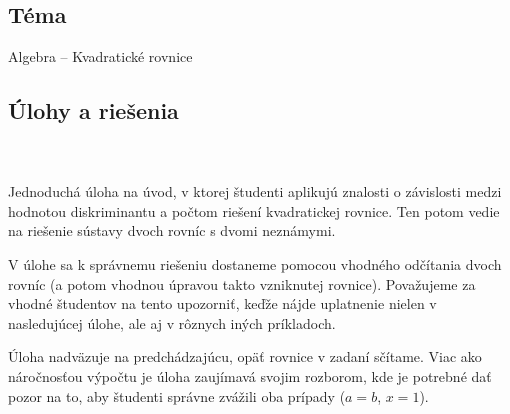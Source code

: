 
\subsection*{Téma}
Algebra -- Kvadratické rovnice


\subsection*{Úlohy a riešenia}



\\
\\
\kom Jednoduchá úloha na úvod, v ktorej študenti aplikujú znalosti o závislosti medzi hodnotou diskriminantu a počtom riešení kvadratickej rovnice. Ten potom vedie na riešenie sústavy dvoch rovníc s dvomi neznámymi.



\kom V úlohe sa k správnemu riešeniu dostaneme pomocou vhodného odčítania dvoch rovníc (a potom vhodnou úpravou takto vzniknutej rovnice). Považujeme za vhodné študentov na tento  upozorniť, keďže nájde uplatnenie nielen v nasledujúcej úlohe, ale aj v rôznych iných príkladoch.



\kom Úloha nadväzuje na predchádzajúcu, opäť rovnice v zadaní sčítame. Viac ako náročnosťou výpočtu je úloha zaujímavá svojim rozborom, kde je potrebné dať pozor na to, aby študenti správne zvážili oba prípady ($a=b$, $x=1$).






